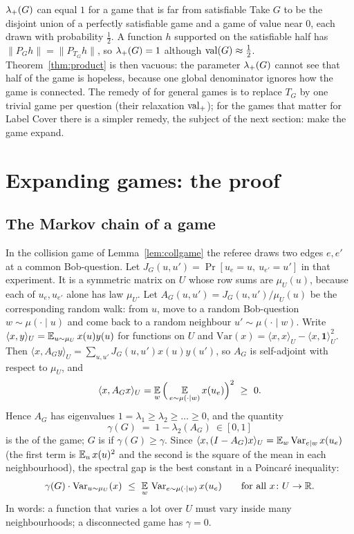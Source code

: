 \begin{pitfall}{$\lambda_{+}(G)$ can equal $1$ for a game that is far from satisfiable}
Take $G$ to be the disjoint union of a perfectly satisfiable game and a game of value near $0$, each drawn with probability $\frac12$.  A function $h$ supported on the satisfiable half has $\|P_Gh\|=\|P_{T_G}h\|$, so $\lambda_{+}(G)=1$ although $\operatorname{val}(G)\approx\frac12$.
Theorem~\ref{thm:product} is then vacuous: the parameter $\lambda_{+}(G)$ cannot see that half of the game is hopeless, because one global denominator ignores how the game is connected.  The remedy of \citet{DinurSteurer14} for general games is to replace $T_G$ by one trivial game per question (their relaxation $\operatorname{val}_+$);
for the games that matter for Label Cover there is a simpler remedy, the subject of the next section: make the game expand.
\end{pitfall}


\section{Expanding games: the proof}
\label{sec:expander}

\subsection{The Markov chain of a game}

In the collision game of Lemma~\ref{lem:collgame} the referee draws two edges $e,e'$ at a common Bob-question.  Let $J_G(u,u')=\Pr[u_e=u,\ u_{e'}=u']$ in that experiment.  It is a symmetric matrix on $U$ whose row sums are $\mu_U(u)$, because each of $u_e,u_{e'}$ alone has law $\mu_U$.
Let $A_G(u,u')=J_G(u,u')/\mu_U(u)$ be the corresponding random walk: from $u$, move to a random Bob-question $w\sim\mu(\cdot\mid u)$ and come back to a random neighbour $u'\sim\mu(\cdot\mid w)$.  Write $\langle x,y\rangle_U=\operatorname*{\mathbb{E}}_{u\sim\mu_U}x(u)y(u)$ for functions on $U$ and $\mathrm{Var}(x)=\langle x,x\rangle_U-\langle x,\mathbf 1\rangle_U^2$.
Then $\langle x,A_Gy\rangle_U=\sum_{u,u'}J_G(u,u')x(u)y(u')$, so $A_G$ is self-adjoint with respect to $\mu_U$, and
\[
  \langle x,A_Gx\rangle_U=\operatorname*{\mathbb{E}}_w\Big(\operatorname*{\mathbb{E}}_{e\sim\mu(\cdot\mid w)}x(u_e)\Big)^2\ \ge\ 0 .
\]
Hence $A_G$ has eigenvalues $1=\lambda_1\ge\lambda_2\ge\dots\ge0$, and the quantity
\[
  \gamma(G)\;=\;1-\lambda_2(A_G)\ \in[0,1]
\]
is the  of the game; $G$ is  if $\gamma(G)\ge\gamma$.  Since $\langle x,(I-A_G)x\rangle_U=\operatorname*{\mathbb{E}}_w\mathrm{Var}_{e\mid w}\,x(u_e)$ (the first term is $\operatorname*{\mathbb{E}}_ux(u)^2$ and the second is the square of the mean in each neighbourhood), the spectral gap is the best constant in a Poincar\'e inequality:
\begin{equation}\label{eq:poincare}
  \gamma(G)\cdot\mathrm{Var}_{u\sim\mu_U}(x)\ \le\ \E_w\,\mathrm{Var}_{e\sim\mu(\cdot\mid w)}\,x(u_e)\qquad\text{for all }x\colon U\to\R.
\end{equation}
In words: a function that varies a lot over $U$ must vary inside many neighbourhoods; a disconnected game has $\gamma=0$.

